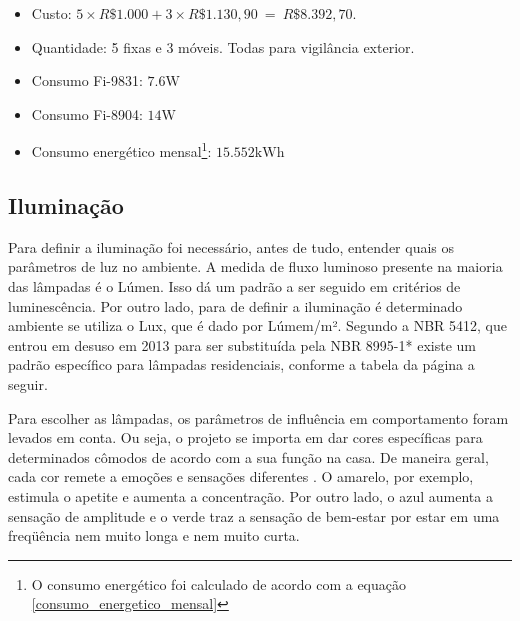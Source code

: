 \begin{itemize}
\item Custo: $5\times R\$ 1.000 + 3\times R\$1.130,90\ =\ R\$ 8.392,70$.
\item Quantidade: 5 fixas e 3 móveis. Todas para vigilância exterior.
\item Consumo Fi-9831: $7.6 \si{\watt}$
\item Consumo Fi-8904: $14 \si{\watt}$
\item Consumo energético mensal\footnote{O consumo energético foi calculado de acordo com a equação \ref{consumo_energetico_mensal}}: $15.552 \si{\kilo\watt\hour}$
\end{itemize}

\subsection{Iluminação}

	Para definir a iluminação foi necessário, antes de tudo, entender quais os parâmetros de luz no ambiente. A medida de fluxo luminoso presente na maioria das lâmpadas é o Lúmen. Isso dá um padrão a ser seguido em critérios de luminescência. Por outro lado, para de definir a iluminação é determinado ambiente se utiliza o Lux, que é dado por Lúmem/m². Segundo a NBR 5412, que entrou em desuso em 2013 para ser substituída pela NBR 8995-1\cite{DisciplinasUTFPR}* existe um padrão específico para lâmpadas residenciais, conforme a tabela da página a seguir.

	Para escolher as lâmpadas, os parâmetros de influência em comportamento foram levados em conta. Ou seja, o projeto se importa em dar cores específicas para determinados cômodos de acordo com a sua função na casa. De maneira geral, cada cor remete a emoções e sensações diferentes \cite{InfluenciaGoi}. O amarelo, por exemplo, estimula o apetite e aumenta a concentração. Por outro lado, o azul aumenta a sensação de amplitude e o verde traz a sensação de bem-estar por estar em uma freqüência nem muito longa e nem muito curta. 

